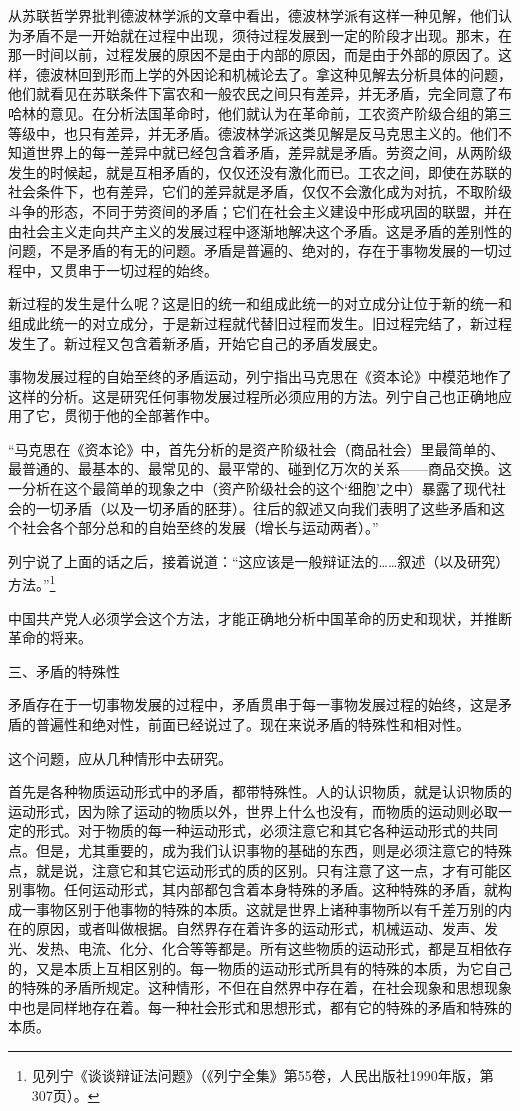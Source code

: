 \documentclass[UTF8, 12pt, a4paper]{ctexrep}
\begin{document}
从苏联哲学界批判德波林学派的文章中看出，德波林学派有这样一种见解，他们认为矛盾不是一开始就在过程中出现，须待过程发展到一定的阶段才出现。那末，在那一时间以前，过程发展的原因不是由于内部的原因，而是由于外部的原因了。这样，德波林回到形而上学的外因论和机械论去了。拿这种见解去分析具体的问题，他们就看见在苏联条件下富农和一般农民之间只有差异，并无矛盾，完全同意了布哈林的意见。在分析法国革命时，他们就认为在革命前，工农资产阶级合组的第三等级中，也只有差异，并无矛盾。德波林学派这类见解是反马克思主义的。他们不知道世界上的每一差异中就已经包含着矛盾，差异就是矛盾。劳资之间，从两阶级发生的时候起，就是互相矛盾的，仅仅还没有激化而已。工农之间，即使在苏联的社会条件下，也有差异，它们的差异就是矛盾，仅仅不会激化成为对抗，不取阶级斗争的形态，不同于劳资间的矛盾；它们在社会主义建设中形成巩固的联盟，并在由社会主义走向共产主义的发展过程中逐渐地解决这个矛盾。这是矛盾的差别性的问题，不是矛盾的有无的问题。矛盾是普遍的、绝对的，存在于事物发展的一切过程中，又贯串于一切过程的始终。

新过程的发生是什么呢？这是旧的统一和组成此统一的对立成分让位于新的统一和组成此统一的对立成分，于是新过程就代替旧过程而发生。旧过程完结了，新过程发生了。新过程又包含着新矛盾，开始它自己的矛盾发展史。

事物发展过程的自始至终的矛盾运动，列宁指出马克思在《资本论》中模范地作了这样的分析。这是研究任何事物发展过程所必须应用的方法。列宁自己也正确地应用了它，贯彻于他的全部著作中。

“马克思在《资本论》中，首先分析的是资产阶级社会（商品社会）里最简单的、最普通的、最基本的、最常见的、最平常的、碰到亿万次的关系——商品交换。这一分析在这个最简单的现象之中（资产阶级社会的这个‘细胞’之中）暴露了现代社会的一切矛盾（以及一切矛盾的胚芽）。往后的叙述又向我们表明了这些矛盾和这个社会各个部分总和的自始至终的发展（增长与运动两者）。”

列宁说了上面的话之后，接着说道：“这应该是一般辩证法的……叙述（以及研究）方法。”\footnote{见列宁《谈谈辩证法问题》（《列宁全集》第55卷，人民出版社1990年版，第307页）。}

中国共产党人必须学会这个方法，才能正确地分析中国革命的历史和现状，并推断革命的将来。

三、矛盾的特殊性

矛盾存在于一切事物发展的过程中，矛盾贯串于每一事物发展过程的始终，这是矛盾的普遍性和绝对性，前面已经说过了。现在来说矛盾的特殊性和相对性。

这个问题，应从几种情形中去研究。

首先是各种物质运动形式中的矛盾，都带特殊性。人的认识物质，就是认识物质的运动形式，因为除了运动的物质以外，世界上什么也没有，而物质的运动则必取一定的形式。对于物质的每一种运动形式，必须注意它和其它各种运动形式的共同点。但是，尤其重要的，成为我们认识事物的基础的东西，则是必须注意它的特殊点，就是说，注意它和其它运动形式的质的区别。只有注意了这一点，才有可能区别事物。任何运动形式，其内部都包含着本身特殊的矛盾。这种特殊的矛盾，就构成一事物区别于他事物的特殊的本质。这就是世界上诸种事物所以有千差万别的内在的原因，或者叫做根据。自然界存在着许多的运动形式，机械运动、发声、发光、发热、电流、化分、化合等等都是。所有这些物质的运动形式，都是互相依存的，又是本质上互相区别的。每一物质的运动形式所具有的特殊的本质，为它自己的特殊的矛盾所规定。这种情形，不但在自然界中存在着，在社会现象和思想现象中也是同样地存在着。每一种社会形式和思想形式，都有它的特殊的矛盾和特殊的本质。
\end{document}
